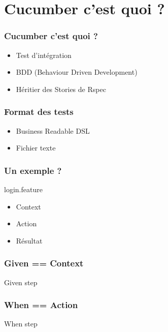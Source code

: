 \documentclass{beamer}
\begin{document}
\section{Cucumber c'est quoi ?}

\begin{frame}
	\frametitle{Cucumber c'est quoi ?}
	\begin{itemize}
    \item Test d'intégration
    \item BDD (Behaviour Driven Development)
    \item Héritier des Stories de Rspec
	\end{itemize}
\end{frame}

\begin{frame}
  \frametitle{Format des tests}
  \begin{itemize}
    \item Business Readable DSL
    \item Fichier texte
  \end{itemize}
\end{frame}

\begin{frame}
  \frametitle{Un exemple ?}
  \begin{beamerboxesrounded}{login.feature}
    
  \end{beamerboxesrounded}
\end{frame}

\begin{frame}
  \begin{itemize}
    \item Context
    \item Action
    \item R\'esultat
  \end{itemize}
\end{frame}

\begin{frame}
  \frametitle{Given == Context}
  \begin{beamerboxesrounded}{Given step}
    
  \end{beamerboxesrounded}
\end{frame}

\begin{frame}
  \frametitle{When == Action}
  \begin{beamerboxesrounded}{When step}
    
  \end{beamerboxesrounded}
\end{frame}
\end{document}
